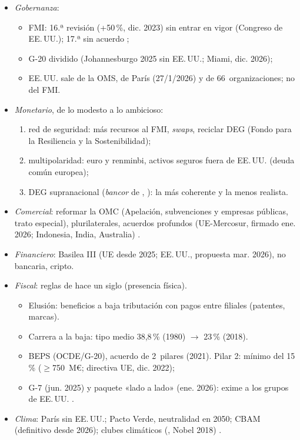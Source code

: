 \documentclass{article}
\begin{document}
\begin{columnas}
\begin{itemize}
\item \emph{Gobernanza}:
  \begin{itemize}
  \item FMI: 16.ª revisión (+50\,\%, dic. 2023) sin entrar en vigor (Congreso de EE.\,UU.); 17.ª sin acuerdo ;
  \item G-20 dividido (Johannesburgo 2025 sin EE.\,UU.; Miami, dic. 2026);
  \item EE.\,UU. sale de la OMS, de París (27/1/2026) y de 66~organizaciones; no del FMI.
  \end{itemize}
\item \emph{Monetario}, de lo modesto a lo ambicioso:
  \begin{enumerate}
  \item red de seguridad: más recursos al FMI, \emph{swaps}, reciclar DEG (Fondo para la Resiliencia y la Sostenibilidad);
  \item multipolaridad: euro y renminbi, activos seguros fuera de EE.\,UU. (deuda común europea);
  \item DEG supranacional (\emph{bancor} de , ): la más coherente y la menos realista.
  \end{enumerate}
\item \emph{Comercial}: reformar la OMC (Apelación, subvenciones y empresas públicas, trato especial), plurilaterales, acuerdos profundos (UE-Mercosur, firmado ene. 2026; Indonesia, India, Australia) .
\item \emph{Financiero}: Basilea III (UE desde 2025; EE.\,UU., propuesta mar. 2026), no bancaria, cripto.
\item \emph{Fiscal}: reglas de hace un siglo (presencia física).
  \begin{itemize}
  \item Elusión: beneficios a baja tributación con pagos entre filiales (patentes, marcas).
  \item Carrera a la baja: tipo medio 38,8\,\% (1980) $\to$ 23\,\% (2018).
  \item BEPS (OCDE/G-20), acuerdo de 2~pilares (2021). Pilar 2: mínimo del 15\,\% ($\geq$750~M€; directiva UE, dic. 2022);
  \item G-7 (jun. 2025) y paquete «lado a lado» (ene. 2026): exime a los grupos de EE.\,UU. .
  \end{itemize}
\item \emph{Clima}: París sin EE.\,UU.; Pacto Verde, neutralidad en 2050; CBAM (definitivo desde 2026); clubes climáticos (, Nobel 2018) .
\end{itemize}


\end{columnas}
\end{document}
